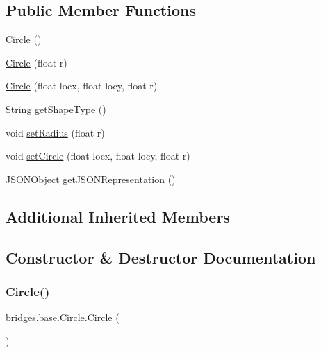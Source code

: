 \subsection*{Public Member Functions}
\begin{DoxyCompactItemize}
\item 
\hyperlink{classbridges_1_1base_1_1_circle_a807231dff01120041d7d209d049e3029}{Circle} ()
\item 
\hyperlink{classbridges_1_1base_1_1_circle_a32543e951646009960c1839b2b8e1a0a}{Circle} (float r)
\item 
\hyperlink{classbridges_1_1base_1_1_circle_a04460bea57f9ef4bd0a3d45e9a937096}{Circle} (float locx, float locy, float r)
\item 
String \hyperlink{classbridges_1_1base_1_1_circle_a234c3622e50d2e30d6b864247430a1cb}{get\+Shape\+Type} ()
\item 
void \hyperlink{classbridges_1_1base_1_1_circle_a38c9f2a569af42461323239ba90f559e}{set\+Radius} (float r)
\item 
void \hyperlink{classbridges_1_1base_1_1_circle_ac11cce75c482bb5c5751dfd1d5353b44}{set\+Circle} (float locx, float locy, float r)
\item 
J\+S\+O\+N\+Object \hyperlink{classbridges_1_1base_1_1_circle_ad6a8b8e2dca562fd3fa5254ee861ed70}{get\+J\+S\+O\+N\+Representation} ()
\end{DoxyCompactItemize}
\subsection*{Additional Inherited Members}


\subsection{Constructor \& Destructor Documentation}
\mbox{\label{classbridges_1_1base_1_1_circle_a807231dff01120041d7d209d049e3029}} 
\subsubsection{\texorpdfstring{Circle()}{Circle()}\hspace{0.1cm}{\footnotesize\ttfamily [1/3]}}
{\footnotesize\ttfamily bridges.\+base.\+Circle.\+Circle (\begin{DoxyParamCaption}{ }\end{DoxyParamCaption})}

